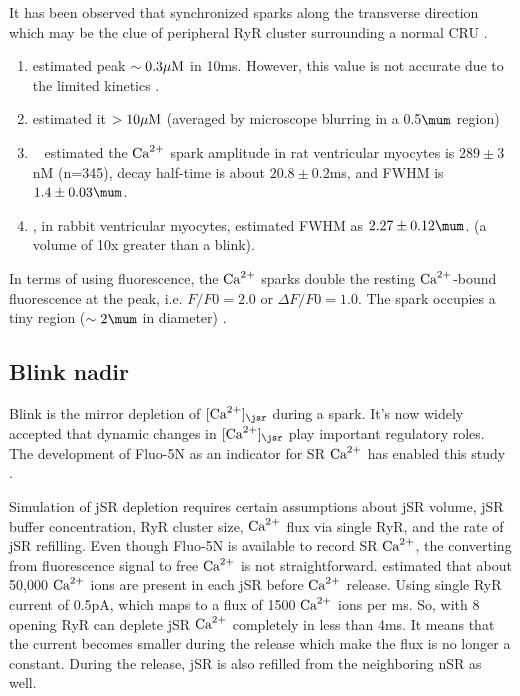 It has been observed that synchronized sparks along the transverse direction
which may be the clue of peripheral RyR cluster surrounding a normal CRU
\citep{parker1996csi}.

\begin{enumerate}
  \item \citep{cheng1993cse} estimated peak $\sim 0.3{\mu\text{M}}$ in 10ms.
  However, this value is not accurate due to the limited kinetics . 
  \item \citep{smith1998} estimated it $> 10{\mu\text{M}}$ (averaged by microscope
  blurring in a 0.5$\mum$ region)
  \item ~\citep{collier1999}
estimated the ${\text{Ca}^{2+}}$ spark amplitude in rat ventricular myocytes is
$289\pm 3$nM (n=345), decay half-time is about $20.8\pm0.2$ms, and
FWHM is $1.4\pm 0.03\mum$.
\item \citep{brochet2011}, in rabbit ventricular myocytes, estimated FWHM as
$2.27\pm 0.12\mum$. (a volume of 10x greater than a blink). 
\end{enumerate}

In terms of using fluorescence, the ${\text{Ca}^{2+}}$ sparks double the resting ${\text{Ca}^{2+}}$-bound
fluorescence at the peak, i.e. $F/F0=2.0$ or $\Delta F/F0 = 1.0$. The spark
occupies a tiny region ($\sim 2\mum$ in diameter) \citep{cannell1999}. 


\subsection{Blink nadir}

Blink is the mirror depletion of $[\Ca]_\jsr$ during a spark. It's now widely
accepted that dynamic changes in $[\Ca]_\jsr$ play important regulatory roles.
The development of Fluo-5N as an indicator for SR ${\text{Ca}^{2+}}$ has enabled this study
\citep{Sobie2012}.

Simulation of jSR depletion requires certain assumptions about jSR volume, jSR
buffer concentration, RyR cluster size, ${\text{Ca}^{2+}}$ flux via single RyR, and the rate
of jSR refilling. Even though Fluo-5N is available to record SR ${\text{Ca}^{2+}}$, the
converting from fluorescence signal to free ${\text{Ca}^{2+}}$ is not straightforward.
\citep{Sobie2012} estimated that about 50,000 ${\text{Ca}^{2+}}$ ions are present in each jSR
before ${\text{Ca}^{2+}}$ release. Using single RyR current of 0.5pA, which maps to a flux of
1500 ${\text{Ca}^{2+}}$ ions per ms. So, with 8 opening RyR can deplete jSR ${\text{Ca}^{2+}}$ completely
in less than 4ms. It means that the current becomes smaller during the release
which make the flux is no longer a constant. During the release, jSR is also
refilled from the neighboring nSR as well. 

